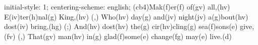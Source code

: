 initial-style: 1;
centering-scheme: english;
(cb4)Mak(f)er(f) of(gv) all,(hv) E(iv)ter(h)nal(g) King,(hv) (,)
Who(hv) day(g) and(jv) night(jv) a(g)bout(hv) dost(iv) bring,(hg) (;)
And(hv) dost(hv) the(g) cir(hv)cling(g) sea(f)sons(e) give,(fv) (,)
That(gv) man(hv) in(g) glad(f)some(e) change(fg) may(e) live.(d)
